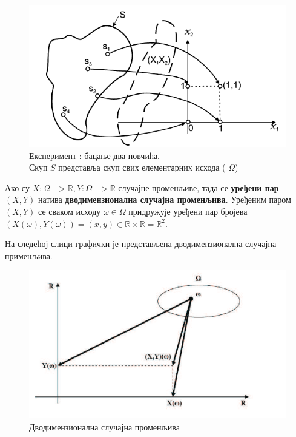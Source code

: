 \begin{figure}[H]
    \centering
\captionsetup{justification=centering}
   \includegraphics[scale=0.8]{./Slike/slika17.png} 
	\caption{Експеримент :  бацање два новчића. \\ Скуп $S$ представља скуп свих елементарних исхода ( $\Omega$)} 
	\label{fig:slika17}
\end{figure}





\begin{de}
Ако су $X : \Omega -> \mathbb{R} , Y : \Omega -> \mathbb{R}$ случајне променљиве, тада се \textbf{уређени пар} $(X,Y)$ натива \textbf{дводимензионална случајна променљива}. Уређеним паром   $(X,Y)$ се  сваком исходу  $\omega \in \Omega$ придружује уређени пар бројева $(X(\omega),Y(\omega))= (x,y) \in \mathbb{R} \times \mathbb{R} = \mathbb{R}^2$.
\end{de}

На следећој слици графички је представљена дводимензионална случајна применљива.



\begin{figure}[H]
    \centering
\captionsetup{justification=centering}
   \includegraphics[scale=0.8]{./Slike/slika16.png} 
	\caption{Дводимензионална случајна променљива} 
	\label{fig:slika13}
\end{figure}

